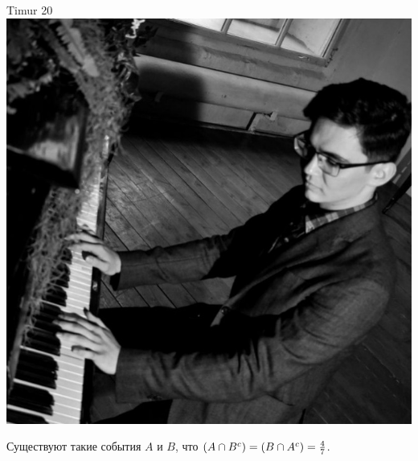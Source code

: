 \documentclass[12pt]{article}
\let\P\relax
\DeclareMathOperator{\P}{\mathbb{P}}
\begin{document}
\begin{minipage}{0.45\textwidth}
\begin{tinderm}{Timur 20}
\includegraphics[width=\textwidth]{tinder-photo/timur.jpg}

  

\begin{mybox}
Существуют такие события $A$ и $B$, что $\P(A \cap B^c) = \P(B \cap A^c) = \frac{4}{7}$.
\end{mybox}
\end{tinderm}
\end{minipage}
\end{document}
